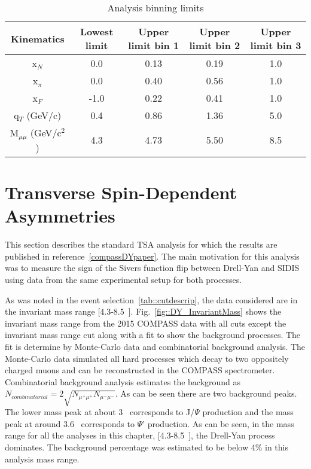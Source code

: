 \begin{table}[h!t]
  \centering
  \begin{tabular}{ |c|c|c|c|c| }
    \hline \textbf{Kinematics}& \textbf{Lowest limit}& \textbf{Upper limit bin
      1}& \textbf{Upper limit bin 2}& \textbf{Upper limit bin 3}\\ \hline
    
    x$_N$& 0.0& 0.13& 0.19& 1.0\\ \hline x$_{\pi}$& 0.0& 0.40& 0.56&
    1.0\\ \hline x$_F$& -1.0& 0.22& 0.41& 1.0\\ \hline q$_T$ (GeV/c)& 0.4& 0.86&
    1.36& 5.0\\ \hline M$_{\mu\mu}$ (GeV/c$^2$)& 4.3& 4.73& 5.50& 8.5 \\ \hline
    
  \end{tabular}
  \caption{Analysis binning limits}
  \label{tab::binning}
\end{table}

\section{Transverse Spin-Dependent Asymmetries} \label{sec::standTSA}
This section describes the standard TSA analysis for which the results are
published in reference~\ref{compassDYpaper}.  The main motivation for this
analysis was to measure the sign of the Sivers function flip between Drell-Yan
and SIDIS using data from the same experimental setup for both processes.

As was noted in the event selection~\ref{tab::cutdescrip}, the data considered
are in the invariant mass range [4.3-8.5~{\gvcw}].
Fig.~\ref{fig::DY_InvariantMass} shows the invariant mass range from the 2015
COMPASS data with all cuts except the invariant mass range cut along with a fit
to show the background processes.  The fit is determine by Monte-Carlo data and
combinatorial background analysis.  The Monte-Carlo data simulated all hard
processes which decay to two oppositely charged muons and can be reconstructed
in the COMPASS spectrometer.  Combinatorial background analysis estimates the
background as $N_{combinatorial} = 2\sqrt{N_{\mu^+\mu^+}N_{\mu^-\mu^-}}$.  As
can be seen there are two background peaks.  The lower mass peak at about
3~{\gvcw} corresponds to J/$\Psi$ production and the mass peak at around
3.6~{\gvcw} corresponds to $\Psi$' production.  As can be seen, in the mass
range for all the analyses in this chapter, [4.3-8.5~{\gvcw}], the Drell-Yan
process dominates.  The background percentage was estimated to be below 4\% in
this analysis mass range.


